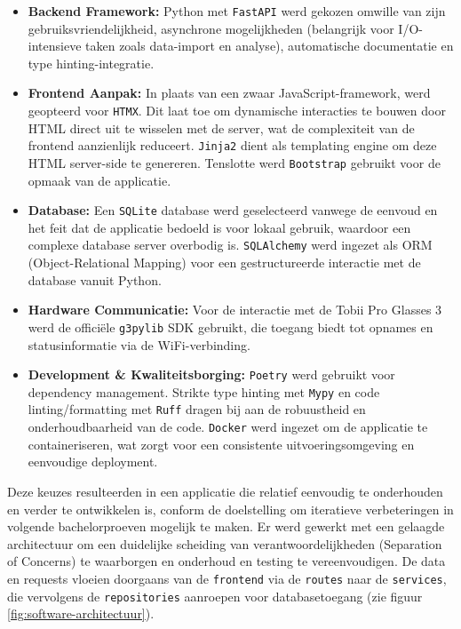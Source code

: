 \begin{itemize}
    \item \textbf{Backend Framework:} Python met \texttt{FastAPI} werd gekozen omwille van zijn gebruiksvriendelijkheid, asynchrone mogelijkheden (belangrijk voor I/O-intensieve taken zoals data-import en analyse), automatische documentatie en type hinting-integratie.
    \item \textbf{Frontend Aanpak:} In plaats van een zwaar JavaScript-framework, werd geopteerd voor \texttt{HTMX}. Dit laat toe om dynamische interacties te bouwen door HTML direct uit te wisselen met de server, wat de complexiteit van de frontend aanzienlijk reduceert. \texttt{Jinja2} dient als templating engine om deze HTML server-side te genereren. Tenslotte werd \texttt{Bootstrap} gebruikt voor de opmaak van de applicatie.
    \item \textbf{Database:} Een \texttt{SQLite} database werd geselecteerd vanwege de eenvoud en het feit dat de applicatie bedoeld is voor lokaal gebruik, waardoor een complexe database server overbodig is. \texttt{SQLAlchemy} werd ingezet als ORM (Object-Relational Mapping) voor een gestructureerde interactie met de database vanuit Python.
    \item \textbf{Hardware Communicatie:} Voor de interactie met de Tobii Pro Glasses 3 werd de officiële \texttt{g3pylib} SDK gebruikt, die toegang biedt tot opnames en statusinformatie via de WiFi-verbinding.
    \item \textbf{Development \& Kwaliteitsborging:} \texttt{Poetry} werd gebruikt voor dependency management. Strikte type hinting met \texttt{Mypy} en code linting/formatting met \texttt{Ruff} dragen bij aan de robuustheid en onderhoudbaarheid van de code. \texttt{Docker} werd ingezet om de applicatie te containeriseren, wat zorgt voor een consistente uitvoeringsomgeving en eenvoudige deployment.
\end{itemize}


Deze keuzes resulteerden in een applicatie die relatief eenvoudig te onderhouden en verder te ontwikkelen is, conform de doelstelling om iteratieve verbeteringen in volgende bachelorproeven mogelijk te maken.
Er werd gewerkt met een gelaagde architectuur om een duidelijke scheiding van verantwoordelijkheden (Separation of Concerns) te waarborgen en onderhoud en testing te vereenvoudigen. 
De data en requests vloeien doorgaans van de \texttt{frontend} via de \texttt{routes} naar de \texttt{services}, die vervolgens de \texttt{repositories} aanroepen voor databasetoegang (zie figuur \ref{fig:software-architectuur}).

